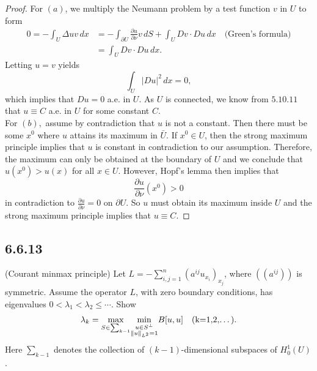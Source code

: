 \documentclass{article}
\DeclarePairedDelimiter{\norm}{\lVert}{\rVert}
\begin{document}
\begin{flushleft}
\begin{proof}
For $(a)$, we multiply the Neumann problem by a test function $v$ in $U$ to form
\begin{align*}
    0 = -\int_U \Delta u v\,dx &=
    -\int_{\partial U}\frac{\partial u}{\partial \nu}v\,dS +\int_U Dv\cdot Du \,dx \quad\text{(Green's formula)} \\&=
    \int_U Dv\cdot Du \,dx.
\end{align*}
Letting $u=v$ yields
$$\int_U |Du|^2\,dx =0,$$
which implies that $Du=0$ a.e. in $U$. As $U$ is connected, we know from $5.10.11$ that $u\equiv C$ a.e. in $U$ for some constant $C$.
\\
\bigskip
For $(b),$ assume by contradiction that $u$ is not a constant. Then there must be some $x^0$ where $u$ attains its maximum in $\bar{U}$. If $x^0\in U$, then the strong maximum principle implies that $u$ is constant in contradiction to our assumption. Therefore, the maximum can only be obtained at the boundary of $U$ and we conclude that $u(x^0)>u(x)$ for all $x\in U$. However, Hopf's lemma then implies that
$$\frac{\partial u}{\partial \nu}(x^0)>0$$
in contradiction to $\frac{\partial u}{\partial \nu}=0$ on $\partial U$. So $u$ must obtain its maximum inside $U$ and the strong maximum principle implies that $u\equiv C$.
\end{proof}



\subsection{\textbf{6.6.13}} (Courant minmax principle) Let $L=-\sum_{i,j=1}^n (a^{ij}u_{x_i})_x_j$, where $((a^{ij}))$ is symmetric. Assume the operator $L$, with zero boundary conditions, has eigenvalues $0 < \lambda_1 < \lambda_2 \le \cdots$. Show
$$\lambda_k = \underset{S\in \sum_{k-1}}{\max} \underset{\begin{subarray}{c}
  u\in S^{\perp} \\
  \norm{u}_{L^2}=1
  \end{subarray}}{\min}B[u,u]\quad \text{(k=1,2,\ldots).}$$
Here $\sum_{k-1}$ denotes the collection of $(k-1)$-dimensional subspaces of $H_0^1(U)$.


\end{flushleft}
\end{document}
